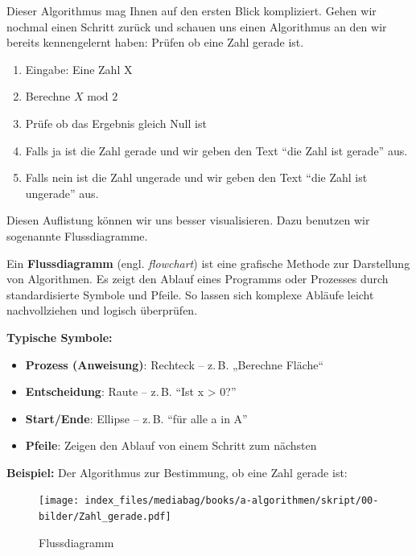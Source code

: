 \documentclass[
  letterpaper,
  DIV=11,
  numbers=noendperiod]{scrreprt}
\providecommand{\tightlist}{%
  \setlength{\itemsep}{0pt}\setlength{\parskip}{0pt}}\usepackage{longtable,booktabs,array}
\begin{document}
Dieser Algorithmus mag Ihnen auf den ersten Blick kompliziert. Gehen wir
nochmal einen Schritt zurück und schauen uns einen Algorithmus an den
wir bereits kennengelernt haben: Prüfen ob eine Zahl gerade ist.

\begin{enumerate}
\def\labelenumi{\arabic{enumi}.}
\tightlist
\item
  Eingabe: Eine Zahl X
\item
  Berechne \(X\text{ mod }2\)
\item
  Prüfe ob das Ergebnis gleich Null ist
\item
  Falls ja ist die Zahl gerade und wir geben den Text ``die Zahl ist
  gerade'' aus.
\item
  Falls nein ist die Zahl ungerade und wir geben den Text ``die Zahl ist
  ungerade'' aus.
\end{enumerate}

Diesen Auflistung können wir uns besser visualisieren. Dazu benutzen wir
sogenannte Flussdiagramme.

\begin{tcolorbox}[enhanced jigsaw, left=2mm, leftrule=.75mm, bottomrule=.15mm, title=\textcolor{quarto-callout-note-color}{\faInfo}\hspace{0.5em}{Flussdiagramme - Visuelle Darstellung von Abläufen}, colback=white, arc=.35mm, breakable, titlerule=0mm, bottomtitle=1mm, colbacktitle=quarto-callout-note-color!10!white, toprule=.15mm, opacityback=0, coltitle=black, rightrule=.15mm, opacitybacktitle=0.6, toptitle=1mm, colframe=quarto-callout-note-color-frame]

Ein \textbf{Flussdiagramm} (engl. \emph{flowchart}) ist eine grafische
Methode zur Darstellung von Algorithmen. Es zeigt den Ablauf eines
Programms oder Prozesses durch standardisierte Symbole und Pfeile. So
lassen sich komplexe Abläufe leicht nachvollziehen und logisch
überprüfen.

\textbf{Typische Symbole:}

\begin{itemize}
\tightlist
\item
  \textbf{Prozess (Anweisung)}: Rechteck -- z.\,B. „Berechne Fläche``
\item
  \textbf{Entscheidung}: Raute -- z.\,B. ``Ist x \textgreater{} 0?''
\item
  \textbf{Start/Ende}: Ellipse -- z.\,B. ``für alle a in A''
\item
  \textbf{Pfeile}: Zeigen den Ablauf von einem Schritt zum nächsten
\end{itemize}

\textbf{Beispiel:} Der Algorithmus zur Bestimmung, ob eine Zahl gerade
ist:

\begin{figure}[H]

{\centering \texttt{[image: index\_files/mediabag/books/a-algorithmen/skript/00-bilder/Zahl\_gerade.pdf]}

}

\caption{Flussdiagramm}

\end{figure}%

\end{tcolorbox}
\end{document}
